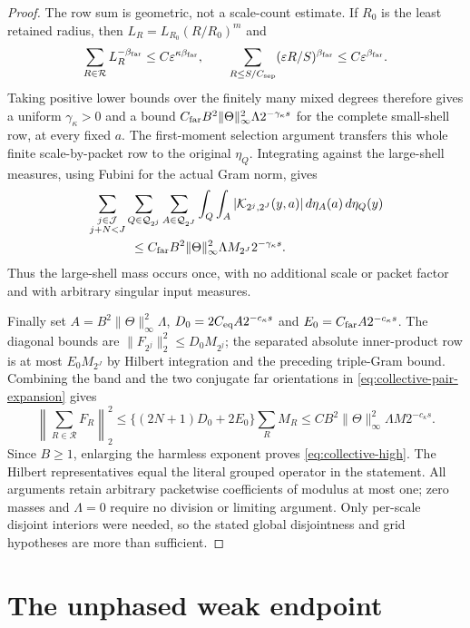 \documentclass[11pt]{article}
\numberwithin{equation}{section}
\theoremstyle{remark}
\theoremstyle{definition}
\newcommand{\norm}[1]{\lVert #1\rVert}
\begin{document}
\begin{proof}
The row sum is geometric, not a scale-count estimate.  If $R_0$ is the
least retained radius, then $L_R=L_{R_0}(R/R_0)^m$ and
\[
 \sum_{R\in\mathcal R}L_R^{-\beta_{\rm far}}
 \le C\varepsilon^{\kappa\beta_{\rm far}},\qquad
 \sum_{R\le S/C_{\rm sep}}(\varepsilon R/S)^{\beta_{\rm far}}
 \le C\varepsilon^{\beta_{\rm far}}.
\]
Taking positive lower bounds over the finitely many mixed degrees
therefore gives a uniform $\gamma_\kappa>0$ and a bound
$C_{\rm far}B^2\norm\Theta_\infty^2\Lambda2^{-\gamma_\kappa s}$
for the complete small-shell row, at every fixed $a$.
The first-moment selection argument transfers this whole finite
scale-by-packet row to the original $\eta_Q$.  Integrating against the
large-shell measures, using Fubini for the actual Gram norm, gives
\[
 \begin{split}
 &\sum_{\substack{j\in\mathcal J\\j+N<J}}
   \sum_{Q\in\mathcal Q_{2^j}}\sum_{A\in\mathcal Q_{2^J}}
       \int_Q\int_A|\mathcal K_{2^j,2^J}(y,a)|
                     \,d\eta_A(a)\,d\eta_Q(y)\\
 &\hspace{12mm}\le
 C_{\rm far}B^2\norm\Theta_\infty^2\Lambda
             M_{2^J}2^{-\gamma_\kappa s}.
 \end{split}
\]
Thus the large-shell mass occurs once, with no additional scale or
packet factor and with arbitrary singular input measures.

Finally set $A=B^2\norm\Theta_\infty^2\Lambda$,
$D_0=2C_{\rm eq}A2^{-c_\kappa s}$ and
$E_0=C_{\rm far}A2^{-c_\kappa s}$.
The diagonal bounds are $\norm{F_{2^j}}_2^2\le D_0M_{2^j}$;
the separated absolute inner-product row is at most $E_0M_{2^J}$
by Hilbert integration and the preceding triple-Gram bound.
Combining the band and the two conjugate far orientations in
\eqref{eq:collective-pair-expansion} gives
\[
 \left\|\sum_{R\in\mathcal R}F_R\right\|_2^2
 \le\{(2N+1)D_0+2E_0\}\sum_R M_R
 \le CB^2\norm\Theta_\infty^2\Lambda M2^{-c_\kappa s}.
\]
Since $B\ge1$, enlarging the harmless exponent proves
\eqref{eq:collective-high}.  The Hilbert representatives equal the
literal grouped operator in the statement.  All arguments retain
arbitrary packetwise coefficients of modulus at most one; zero masses
and $\Lambda=0$ require no division or limiting argument.
Only per-scale disjoint interiors were needed, so the stated global
disjointness and grid hypotheses are more than sufficient.
\end{proof}

\section{The unphased weak endpoint}
\label{sec:unphased-weak}
\end{document}
